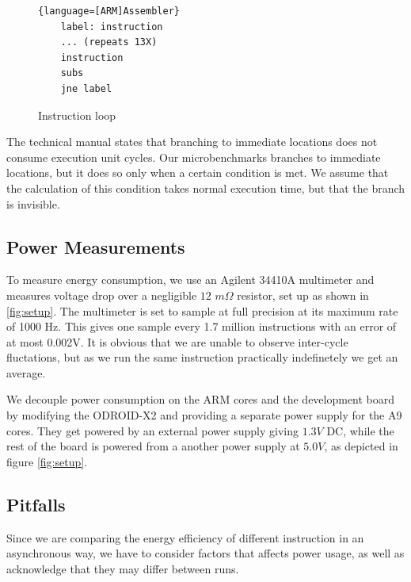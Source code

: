 \begin{figure}
    \begin{lstlisting}{language=[ARM]Assembler}
    label: instruction
    ... (repeats 13X)
    instruction
    subs
    jne label
    \end{lstlisting}
    \caption{Instruction loop}
    \label{list:inst_loop}
\end{figure}

The technical manual states that branching to immediate locations does not
consume execution unit cycles. Our microbenchmarks branches to immediate
locations, but it does so only when a certain condition is met. We assume that
the calculation of this condition takes normal execution time, but that the
branch is invisible.


\subsection{Power Measurements}
To measure energy consumption, we use an Agilent 34410A
multimeter\cite{agilent34410a} and measures voltage drop over a negligible $12$
$m\Omega$ resistor, set up as shown in \autoref{fig:setup}. The multimeter is
set to sample at full precision at its maximum rate of 1000 Hz. This gives one
sample every 1.7 million instructions with an error of at most 0.002V. It is
obvious that we are unable to observe inter-cycle fluctations, but as we run the
same instruction practically indefinetely we get an average.

We decouple power consumption on the ARM cores and the development board by
modifying the ODROID-X2 and providing a separate power supply for the A9 cores.
They get powered by an external power supply giving $1.3V$ DC, while the rest of
the board is powered from a another power supply at $5.0V$, as depicted in
figure \ref{fig:setup}.

\subsection{Pitfalls}
Since we are comparing the energy efficiency of different instruction in an
asynchronous way, we have to consider factors that affects power usage, as well
as acknowledge that they may differ between runs.

